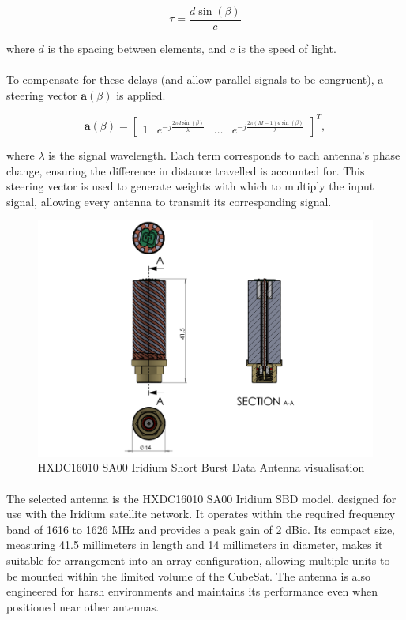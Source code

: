\documentclass[11pt]{article}
\begin{document}
	
	\[
	\tau = \frac{d \sin(\beta)}{c}
	\]
	
	
	where \(d\) is the spacing between elements, and \(c\) is the speed of light.
	
	\paragraph{}To compensate for these delays (and allow parallel signals to be congruent), a steering vector \( \mathbf{a}(\beta) \) is applied.
	
	
	\[
	\mathbf{a}(\beta) = 
	\begin{bmatrix}
		1 & e^{-j \frac{2 \pi d \sin(\beta)}{\lambda}} & \dots & e^{-j \frac{2 \pi (M-1) d \sin(\beta)}{\lambda}}
	\end{bmatrix}^T,
	\]
	
	
	where \(\lambda\) is the signal wavelength. Each term corresponds to each antenna's phase change, ensuring the difference in distance travelled is accounted for. This steering vector is used to generate weights with which to multiply the input signal, allowing every antenna to transmit its corresponding signal.
		
	\begin{figure}[H]
		\centering
		\includegraphics[width=\textwidth]{antenna.png}
		\caption{ HXDC16010 SA00 Iridium Short Burst Data Antenna visualisation}
	\end{figure}
	
	\paragraph{} The selected antenna is the HXDC16010 SA00 Iridium SBD model, designed for use with the Iridium satellite network. It operates within the required frequency band of 1616 to 1626 MHz and provides a peak gain of 2 dBic. Its compact size, measuring 41.5 millimeters in length and 14 millimeters in diameter, makes it suitable for arrangement into an array configuration, allowing multiple units to be mounted within the limited volume of the CubeSat. The antenna is also engineered for harsh environments and maintains its performance even when positioned near other antennas.
	
\end{document}

